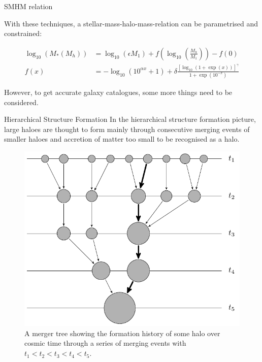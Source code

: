 \begin{frame}{SMHM relation}
    
    With these techniques, a stellar-mass-halo-mass-relation can be parametrised and constrained:
    
    \begin{align}
    \log_{10}(M_*(M_h)) &= 
    \log_{10}(\epsilon M_1) + 
    f \left(\log_{10} \left( \frac{M_h}{M_1} \right) \right) - f(0)
    \label{eq:behroozi_SMHM} \\
    f(x) &= -\log_{10}(10^{\alpha x} + 1) + 
    \delta \frac{ [\log_{10}(1+\exp(x))]^\gamma }{1 + \exp(10^{-x})}
    \label{eq:behroozi_fx}
    \end{align}
    
    \parencite{Behroozi}
   
    However, to get accurate galaxy catalogues, some more things need to be considered.
    
\end{frame}




\begin{frame}{Hierarchical Structure Formation}
    In the hierarchical structure formation picture, large haloes are thought to form mainly through consecutive merging events of smaller haloes and accretion of matter too small to be recognised as a halo.
    
    \begin{figure}[H]
        \centering
        \includegraphics[width=.5\textwidth]{../report/images/tikz/mergertree.pdf}
        \caption{\tiny A merger tree showing the formation history of some halo over cosmic time through a series of merging events with $t_1 < t_2 < t_3 < t_4 < t_5$.}
        \label{fig:mergertree_scheme}
    \end{figure}
    
\end{frame}




